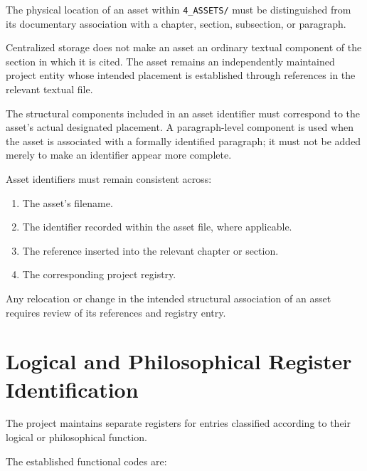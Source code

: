 The physical location of an asset within
\texttt{4\_ASSETS/} must be distinguished from its
documentary association with a chapter, section,
subsection, or paragraph.

Centralized storage does not make an asset an ordinary
textual component of the section in which it is cited.
The asset remains an independently maintained project
entity whose intended placement is established through
references in the relevant textual file.

The structural components included in an asset identifier
must correspond to the asset's actual designated placement.
A paragraph-level component is used when the asset is
associated with a formally identified paragraph; it must
not be added merely to make an identifier appear more
complete.

Asset identifiers must remain consistent across:

\begin{enumerate}
    \item The asset's filename.
    \item The identifier recorded within the asset file,
          where applicable.
    \item The reference inserted into the relevant
          chapter or section.
    \item The corresponding project registry.
\end{enumerate}

Any relocation or change in the intended structural
association of an asset requires review of its references
and registry entry.



\section*{Logical and Philosophical Register Identification}

The project maintains separate registers for entries
classified according to their logical or philosophical
function.

The established functional codes are:

